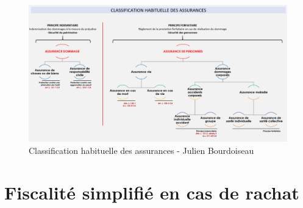 \documentclass{article}
\begin{document}
\begin{figure}[h!]
    \center
    \includegraphics[scale=0.6]{resources/classification-assurances.png}
    \caption{
        \label{classification-assurances} Classification habituelle des assurances - Julien Bourdoiseau
    }
\end{figure}

\newpage
{}
\section{Fiscalité simplifié en cas de rachat}
\label{appendix:fiscalite-vie}
\end{document}
